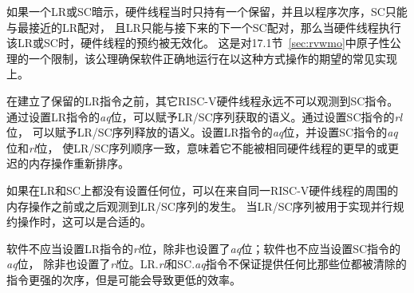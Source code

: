 \begin{commentary}
  如果一个LR或SC暗示，硬件线程当时只持有一个保留，并且以程序次序，SC只能与最接近的LR配对，
  且LR只能与接下来的下一个SC配对，那么当硬件线程执行该LR或SC时，硬件线程的预约被无效化。
  这是对17.1节~\ref{sec:rvwmo}中原子性公理的一个限制，该公理确保软件正确地运行在以这种方式操作的期望的常见实现上。
\end{commentary}

在建立了保留的LR指令之前，其它RISC-V硬件线程永远不可以观测到SC指令。
通过设置LR指令的{\em aq}位，可以赋予LR/SC序列获取的语义。通过设置SC指令的{\em rl}位，
可以赋予LR/SC序列释放的语义。设置LR指令的{\em aq}位，并设置SC指令的{\em aq}位和{\em rl}位，
使LR/SC序列顺序一致，意味着它不能被相同硬件线程的更早的或更迟的内存操作重新排序。

如果在LR和SC上都没有设置任何位，可以在来自同一RISC-V硬件线程的周围的内存操作之前或之后观测到LR/SC序列的发生。
当LR/SC序列被用于实现并行规约操作时，这可以是合适的。

软件不应当设置LR指令的{\em rl}位，除非也设置了{\em aq}位；软件也不应当设置SC指令的{\em aq}位，
除非也设置了{\em rl}位。LR.{\em rl}和SC.{\em aq}指令不保证提供任何比那些位都被清除的指令更强的次序，但是可能会导致更低的效率。

